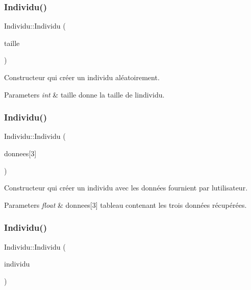 \subsubsection{\texorpdfstring{Individu()}{Individu()}\hspace{0.1cm}{\footnotesize\ttfamily [1/3]}}
{\footnotesize\ttfamily Individu\+::\+Individu (\begin{DoxyParamCaption}\item[{int}]{taille }\end{DoxyParamCaption})}



Constructeur qui créer un individu aléatoirement. 


\begin{DoxyParams}{Parameters}
{\em int} & taille donne la taille de l\textquotesingle{}individu. \\
\hline
\end{DoxyParams}
\mbox{\label{class_individu_a04a849ab0b64d2bcb16cb8ce14c41f62}} 
\subsubsection{\texorpdfstring{Individu()}{Individu()}\hspace{0.1cm}{\footnotesize\ttfamily [2/3]}}
{\footnotesize\ttfamily Individu\+::\+Individu (\begin{DoxyParamCaption}\item[{float}]{donnees\mbox{[}3\mbox{]} }\end{DoxyParamCaption})}



Constructeur qui créer un individu avec les données fournient par l\textquotesingle{}utilisateur. 


\begin{DoxyParams}{Parameters}
{\em float} & donnees\mbox{[}3\mbox{]} tableau contenant les trois données récupérées. \\
\hline
\end{DoxyParams}
\mbox{\label{class_individu_a5347a6d253e44e3447731e4adec648dc}} 
\subsubsection{\texorpdfstring{Individu()}{Individu()}\hspace{0.1cm}{\footnotesize\ttfamily [3/3]}}
{\footnotesize\ttfamily Individu\+::\+Individu (\begin{DoxyParamCaption}\item[{\hyperlink{class_individu}{Individu} \&}]{individu }\end{DoxyParamCaption})}



